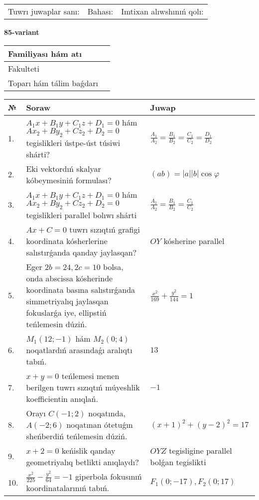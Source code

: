 \documentclass{article}
\begin{document}
\vspace{1cm}

\begin{tabular}{lll}
Tuwrı juwaplar sanı: \underline{\hspace{1.5cm}} & 
Bahası: \underline{\hspace{1.5cm}} & 
Imtixan alıwshınıń qolı: \underline{\hspace{2cm}} \\
\end{tabular}

\egroup

\newpage


\textbf{85-variant}\\

\bgroup
\def\arraystretch{1.6} %

\begin{tabular}{|m{5.7cm}|m{9.5cm}|}
\hline
Familiyası hám atı & \\
\hline
Fakulteti  & \\
\hline
Toparı hám tálim baǵdarı  & \\
\hline
\end{tabular}

\vspace{1cm}

\begin{tabular}{|m{0.7cm}|m{10cm}|m{4cm}|}
\hline
№ & Soraw & Juwap \\
\hline
1. & $A_1x+B_1y+C_1z+D_1=0$ hám $Ax_2+By_2+Cz_2+D_2=0$ tegislikleri ústpe-úst túsiwi shárti? & $\frac{A_1}{A_2}=\frac{B_1}{B_2}=\frac{C_1}{C_2}=\frac{D_1}{D_2}$ \\
\hline
2. & Eki vektordıń skalyar kóbeymesiniń formulası? & $(ab)=|a||b|\cos\varphi$ \\
\hline
3. & $A_1x+B_1y+C_1z+D_1=0$ hám $Ax_2+By_2+Cz_2+D_2=0$ tegislikleri parallel bolıwı shárti & $\frac{A_1}{A_2}=\frac{B_1}{B_2}=\frac{C_1}{C_2}$ \\
\hline
4. & $Ax+C=0$ tuwrı sızıqtıń grafigi koordinata kósherlerine salıstırǵanda qanday jaylasqan? & $OY$ kósherine parallel \\
\hline
5. & Eger $2b=24, 2 c=10$ bolsa, onda abscissa kósherinde koordinata basına salıstırǵanda simmetriyalıq jaylasqan fokuslarǵa iye, ellipstiń teńlemesin dúziń. & $\frac{x^{2}}{169}+\frac{y^{2}}{144}=1$ \\
\hline
6. & $M_{1} (12;-1)$ hám $M_{2} (0;4)$ noqatlardıń arasındaǵı aralıqtı tabıń. & $13$ \\
\hline
7. & $x+y=0$ teńlemesi menen berilgen tuwrı sızıqtıń múyeshlik koefficientin anıqlań. & $- 1$ \\
\hline
8. & Orayı $C (-1;2)$ noqatında, $A (-2;6 )$ noqatınan ótetuǵın sheńberdiń teńlemesin dúziń. & $(x+1)^{2}+(y-2)^{2}=17$ \\
\hline
9. & $x+2=0$ keńislik qanday geometriyalıq betlikti anıqlaydı? &  $OYZ$ tegisligine parallel bolǵan tegislikti \\
\hline
10. & $\frac{x^{2}}{225}-\frac{y^{2}}{64}=-1$ giperbola fokusınıń koordinatalarınıń tabıń. & $F_{1}(0;-17), F_{2}(0;17)$ \\
\hline
\end{tabular}
\end{document}
